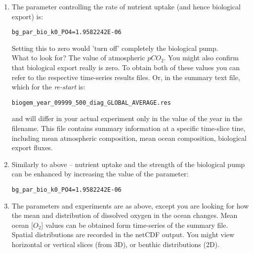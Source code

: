 \documentclass[11pt,fleqn]{book} %
\begin{document}
\begin{enumerate}[noitemsep]

\vspace{1mm}
\item The parameter controlling the rate of nutrient uptake (and hence biological export) is:
\vspace{-2pt}\begin{verbatim}
bg_par_bio_k0_PO4=1.9582242E-06
\end{verbatim}\vspace{-2pt}
Setting this to zero would 'turn off' completely the biological pump.
\\What to look for? The value of atmospheric \(pCO_{2}\). You might also confirm that biological export really is zero. To obtain both of these values you can refer to the respective time-series results files. Or, in the summary text file, which for the \textit{re-start} is:
\vspace{-2pt}\begin{verbatim}
biogem_year_09999_500_diag_GLOBAL_AVERAGE.res
\end{verbatim}\vspace{-2pt}
and will differ in your actual experiment only in the value of the year in the filename. This file contains summary information at a specific time-slice tine, including mean atmospheric composition, mean ocean composition, biological export fluxes.

\vspace{1mm}
\item Similarly to above -- nutrient uptake and the strength of the biological pump can be enhanced by increasing the value of the parameter:
\vspace{-2pt}\begin{verbatim}
bg_par_bio_k0_PO4=1.9582242E-06
\end{verbatim}\vspace{-2pt}

\vspace{1mm}
\item The parameters and experiments are as above, except you are looking for how the mean and distribution of dissolved oxygen in the ocean changes. Mean ocean [\(O_{2}\)] values can be obtained form time-series of the summary file. Spatial distributions are recorded in the netCDF output. You might view horizontal or vertical slices (from 3D), or benthic distributions (2D).


\end{enumerate}
\end{document}

